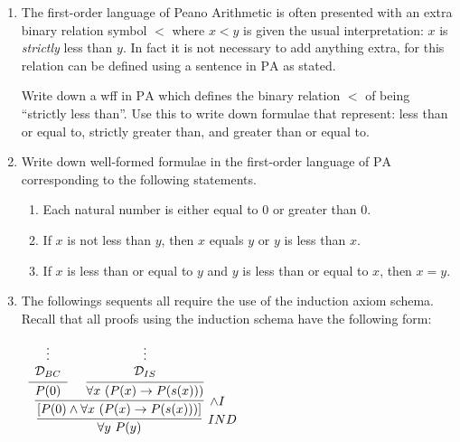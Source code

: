 \documentclass[11pt]{report}
\newcommand{\PA}{\text{PA}}
\begin{document}
\begin{enumerate}
		\item The first-order language of Peano Arithmetic is often presented with an extra binary relation symbol $<$ where $x < y$ is given the usual interpretation: $x$ is \emph{strictly} less than $y$. In fact it is not necessary to add anything extra, for this relation can be defined using a sentence in $\PA$ as stated. 
	
	Write down a wff in $\PA$ which defines the binary relation $<$ of being ``strictly less than''. Use this to write down formulae that represent: less than or equal to, strictly greater than, and greater than or equal to. 


	\item Write down well-formed formulae in the first-order language of $\PA$ corresponding to the following statements. 
	
	\begin{enumerate}
		\item Each natural number is either equal to $0$ or greater than $0$. 			
		\item If $x$ is not less than $y$, then $x$ equals $y$ or $y$ is less than $x$.
		\item If $x$ is less than or equal to $y$ and $y$ is less than or equal to $x$, then $x=y$. 
	\end{enumerate} 

	\newpage
	\item The followings sequents all require the use of the induction axiom schema. Recall that all proofs using the induction schema have the following form: 
	
		\begin{mdframed}
			\begin{center}
				$\begin{array}{c}
					\infer[IND]{\forall y \ P(y)}
						{\infer[\land I]{[P(0) \land \forall x \ (P(x) \to P(s(x)))]}
							{\infer[]{P(0)}{\begin{array}{c} \vdots \\ \mathcal{D}_{BC}\end{array}}
							&
							\infer[]{\forall x \ (P(x) \to P(s(x)))}
								{\begin{array}{c} \vdots \\ \mathcal{D}_{IS}\end{array}}}}
				\end{array}$
			\end{center}
		\end{mdframed}


\end{enumerate}
\end{document}
